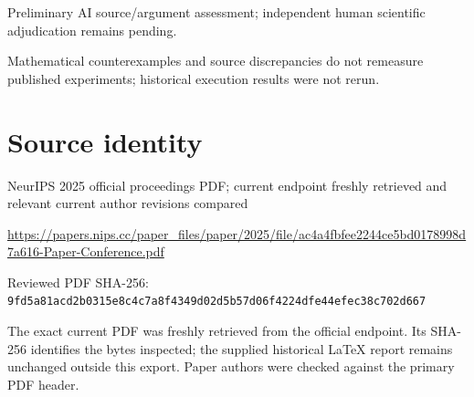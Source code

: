 \documentclass[11pt]{article}
\begin{document}
Preliminary AI source/argument assessment; independent human scientific adjudication remains pending.\par

Mathematical counterexamples and source discrepancies do not remeasure published experiments; historical execution results were not rerun.\par

\section*{Source identity}

NeurIPS 2025 official proceedings PDF; current endpoint freshly retrieved and relevant current author revisions compared

\url{https://papers.nips.cc/paper_files/paper/2025/file/ac4a4fbfee2244ce5bd0178998d7a616-Paper-Conference.pdf}

Reviewed PDF SHA-256: \nolinkurl{9fd5a81acd2b0315e8c4c7a8f4349d02d5b57d06f4224dfe44efec38c702d667}

The exact current PDF was freshly retrieved from the official endpoint. Its SHA-256 identifies the bytes inspected; the supplied historical LaTeX report remains unchanged outside this export. Paper authors were checked against the primary PDF header.
\end{document}
